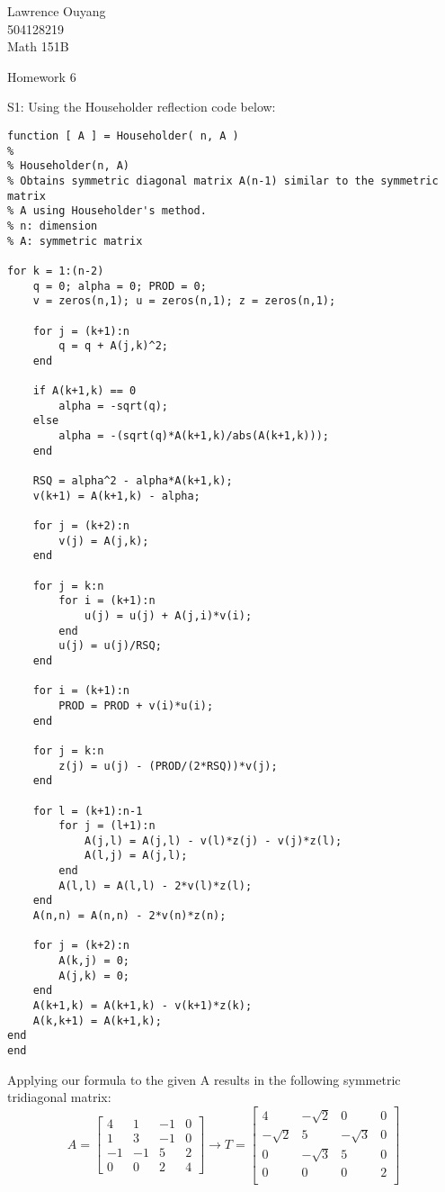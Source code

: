 \documentclass[12pt]{article}
\begin{document}
\begin{flushright}
Lawrence Ouyang\\
504128219\\
Math 151B\\
\end{flushright}

\begin{center}
Homework 6
\end{center}

S1: Using the Householder reflection code below:
\begin{lstlisting}
function [ A ] = Householder( n, A )
%
% Householder(n, A)
% Obtains symmetric diagonal matrix A(n-1) similar to the symmetric matrix
% A using Householder's method.
% n: dimension
% A: symmetric matrix

for k = 1:(n-2)
    q = 0; alpha = 0; PROD = 0;
    v = zeros(n,1); u = zeros(n,1); z = zeros(n,1);
    
    for j = (k+1):n
        q = q + A(j,k)^2;
    end
    
    if A(k+1,k) == 0
        alpha = -sqrt(q);
    else
        alpha = -(sqrt(q)*A(k+1,k)/abs(A(k+1,k)));
    end
    
    RSQ = alpha^2 - alpha*A(k+1,k);
    v(k+1) = A(k+1,k) - alpha;
    
    for j = (k+2):n
        v(j) = A(j,k);
    end
    
    for j = k:n
        for i = (k+1):n
            u(j) = u(j) + A(j,i)*v(i);
        end
        u(j) = u(j)/RSQ;
    end
    
    for i = (k+1):n
        PROD = PROD + v(i)*u(i);
    end
    
    for j = k:n
        z(j) = u(j) - (PROD/(2*RSQ))*v(j);
    end
    
    for l = (k+1):n-1
        for j = (l+1):n
            A(j,l) = A(j,l) - v(l)*z(j) - v(j)*z(l);
            A(l,j) = A(j,l);
        end
        A(l,l) = A(l,l) - 2*v(l)*z(l);
    end
    A(n,n) = A(n,n) - 2*v(n)*z(n);
    
    for j = (k+2):n
        A(k,j) = 0;
        A(j,k) = 0;
    end
    A(k+1,k) = A(k+1,k) - v(k+1)*z(k);
    A(k,k+1) = A(k+1,k);
end
end
\end{lstlisting}
Applying our formula to the given A results in the following symmetric tridiagonal matrix:
\[
A =
\begin{bmatrix}
4 & 1 & -1 & 0 \\
1 & 3 & -1 & 0 \\
-1 & -1 & 5 & 2 \\
0 & 0 & 2 & 4
\end{bmatrix}
\rightarrow
T =
\begin{bmatrix}
4 & -\sqrt{2} & 0 & 0 \\
-\sqrt{2} & 5 & -\sqrt{3} & 0 \\
0 & -\sqrt{3} & 5 & 0 \\
0 & 0 & 0 & 2 \\
\end{bmatrix}
\]
\end{document}
